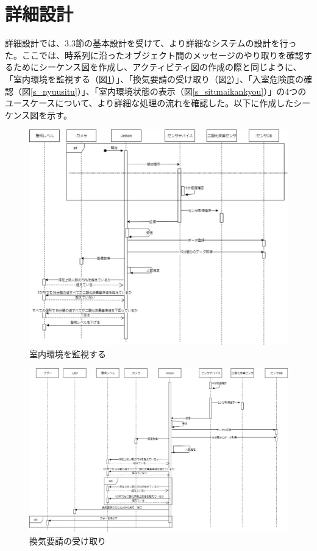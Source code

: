 \section{詳細設計}
詳細設計では、3.3節の基本設計を受けて、より詳細なシステムの設計を行った。ここでは、時系列に沿ったオブジェクト間のメッセージのやり取りを確認するためにシーケンス図を作成し、アクティビティ図の作成の際と同じように、「室内環境を監視する（図\ref{s_kansi}）」、「換気要請の受け取り（図\ref{s_kanki}）」、「入室危険度の確認（図\ref{s_nyuusitu}）」、「室内環境状態の表示（図\ref{s_situnaikankyou}）」の4つのユースケースについて、より詳細な処理の流れを確認した。以下に作成したシーケンス図を示す。


\begin{figure}[H]
	\centering
	\includegraphics[width=15cm]{s_kansi.eps}
	\caption{室内環境を監視する}
	\label{s_kansi}
\end{figure}
\begin{figure}[H]
	\centering
	\includegraphics[width=15cm]{s_kanki.eps}
	\caption{換気要請の受け取り}
	\label{s_kanki}
\end{figure}
